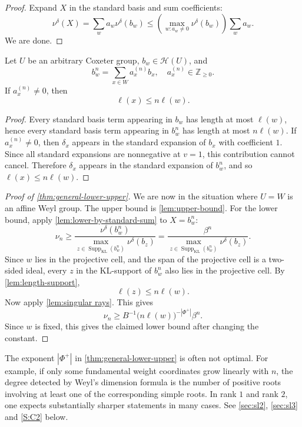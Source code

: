 \documentclass[a4paper,11pt]{amsart}
\newcommand{\Hecke}{\mc H}
\newcommand{\mc}{\mathcal}
\numberwithin{equation}{subsection}
\theoremstyle{definition}
\theoremstyle{remark}
\begin{document}
\begin{proof}
Expand $X$ in the standard basis and sum coefficients:
\[
\nu^\delta(X)
=
\sum_w a_w\nu^\delta(b_w)
\leq
\left(\max_{w:a_w\neq 0}\nu^\delta(b_w)\right)\sum_w a_w.
\]
We are done.
\end{proof}

\begin{Lemma}\label{lem:length-support}
Let $U$ be an arbitrary Coxeter group, $b_w \in \Hecke(U)$, and
\[
b_w^n=\sum_{x\in W}a_x^{(n)}b_x,
\quad
a_x^{(n)}\in \mathbb Z_{\geq 0}.
\]
If $a_x^{(n)}\neq 0$, then
\[
\ell(x)\leq n\ell(w).
\]
\end{Lemma}

\begin{proof}
Every standard basis term appearing in $b_w$ has length at most $\ell(w)$,
hence every standard basis term appearing in $b_w^n$ has length at most
$n\ell(w)$. If $a_x^{(n)}\neq 0$, then $\delta_x$ appears in the standard
expansion of $b_x$ with coefficient $1$. Since all standard expansions are
nonnegative at $v=1$, this contribution cannot cancel. Therefore $\delta_x$
appears in the standard expansion of $b_w^n$, and so $\ell(x)\leq n\ell(w)$.
\end{proof}

\begin{proof}[Proof of \autoref{thm:general-lower-upper}]
We are now in the situation where $U = W$ is an affine Weyl group. The upper bound is \autoref{lem:upper-bound}. For the lower bound, apply
\autoref{lem:lower-by-standard-sum} to \(X=b_w^n\):
\[
\nu_n\geq
\frac{\nu^\delta(b_w^n)}
{\max_{z\in\operatorname{Supp}_{\mathrm{KL}}(b_w^n)}
\nu^\delta(b_z)}
=
\frac{\beta^n}
{\max_{z\in\operatorname{Supp}_{\mathrm{KL}}(b_w^n)}
\nu^\delta(b_z)}.
\]
Since \(w\) lies in the projective cell, and the span of the projective cell
is a two-sided ideal, every \(z\) in the KL-support of \(b_w^n\) also lies in
the projective cell. By \autoref{lem:length-support},
\[
\ell(z)\leq n\ell(w).
\]
Now apply \autoref{lem:singular rays}. This gives
\[
\nu_n
\geq
B^{-1}\bigl(n\ell(w)\bigr)^{-|\Phi^+|}\beta^n.
\]
Since \(w\) is fixed, this gives the claimed lower bound after changing the
constant.
\end{proof}

\begin{Remark}
The exponent \(|\Phi^+|\) in \autoref{thm:general-lower-upper} is often not optimal. For example,
if only some fundamental weight coordinates grow linearly with \(n\), the
degree detected by Weyl's dimension formula is the number of positive roots
involving at least one of the corresponding simple roots. In rank \(1\) and
rank \(2\), one expects substantially sharper statements in many cases. 
See \autoref{sec:sl2}, \autoref{sec:sl3} and \autoref{S:C2} below.
\end{Remark}
\end{document}
